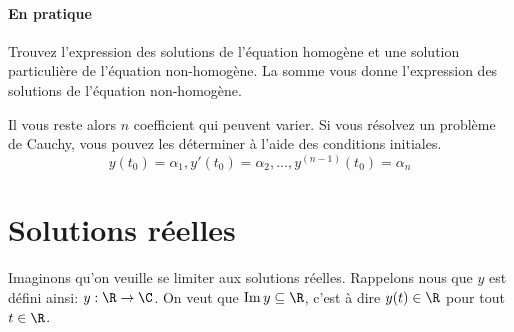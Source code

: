\paragraph{En pratique}
Trouvez l'expression des solutions de l'équation homogène et une solution particulière de l'équation non-homogène.
La somme vous donne l'expression des solutions de l'équation non-homogène.

Il vous reste alors $n$ coefficient qui peuvent varier.
Si vous résolvez un problème de Cauchy, vous pouvez les déterminer à l'aide des conditions initiales.
\[ y(t_0) = \alpha_1, y'(t_0) = \alpha_2, \dots , y^{(n-1)}(t_0) = \alpha_n \]

\section{Solutions réelles}
Imaginons qu'on veuille se limiter aux solutions réelles.  Rappelons nous que $y$ est défini ainsi: $y: \R \to \C$.
On veut que $\newim y \subseteq \R$, c'est à dire $y(t) \in \R$ pour tout $t \in \R$.

